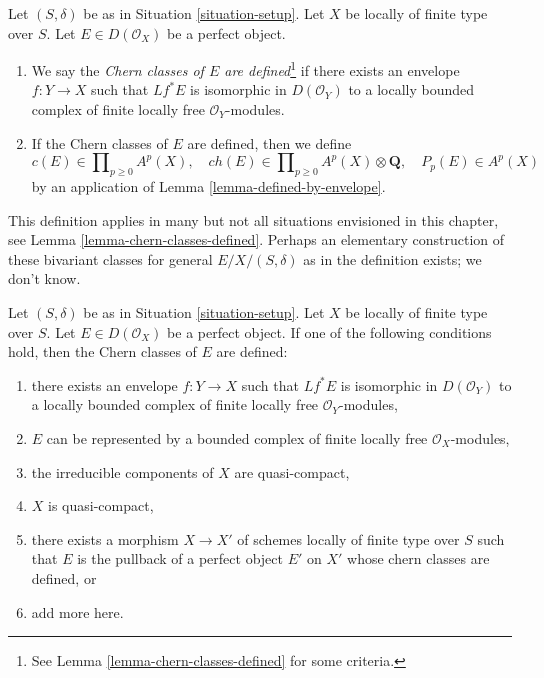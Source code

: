 \begin{definition}
\label{definition-defined-on-perfect}
Let $(S, \delta)$ be as in Situation \ref{situation-setup}.
Let $X$ be locally of finite type over $S$. Let $E \in D(\mathcal{O}_X)$
be a perfect object.
\begin{enumerate}
\item We say the {\it Chern classes of $E$ are defined}\footnote{See
Lemma \ref{lemma-chern-classes-defined} for some criteria.} if there exists
an envelope $f : Y \to X$ such that $Lf^*E$ is isomorphic in
$D(\mathcal{O}_Y)$ to a locally bounded complex of finite locally free
$\mathcal{O}_Y$-modules.
\item If the Chern classes of $E$ are defined, then we define
$$
c(E) \in \prod\nolimits_{p \geq 0} A^p(X),\quad
ch(E) \in
\prod\nolimits_{p \geq 0} A^p(X) \otimes \mathbf{Q},\quad
P_p(E) \in A^p(X)
$$
by an application of Lemma \ref{lemma-defined-by-envelope}.
\end{enumerate}
\end{definition}

\noindent
This definition applies in many but not all situations envisioned
in this chapter, see Lemma \ref{lemma-chern-classes-defined}.
Perhaps an elementary construction of these bivariant classes for general
$E/X/(S,\delta)$ as in the definition exists; we don't know.

\begin{lemma}
\label{lemma-chern-classes-defined}
Let $(S, \delta)$ be as in Situation \ref{situation-setup}.
Let $X$ be locally of finite type over $S$. Let $E \in D(\mathcal{O}_X)$
be a perfect object. If one of the following conditions hold, then
the Chern classes of $E$ are defined:
\begin{enumerate}
\item there exists an envelope $f : Y \to X$ such that $Lf^*E$
is isomorphic in $D(\mathcal{O}_Y)$ to a locally bounded complex of finite
locally free $\mathcal{O}_Y$-modules,
\item $E$ can be represented by a bounded complex of finite locally
free $\mathcal{O}_X$-modules,
\item the irreducible components of $X$ are quasi-compact,
\item $X$ is quasi-compact,
\item there exists a morphism $X \to X'$ of schemes locally of finite type
over $S$ such that $E$ is the pullback of a perfect object $E'$ on $X'$
whose chern classes are defined, or
\item add more here.
\end{enumerate}
\end{lemma}

